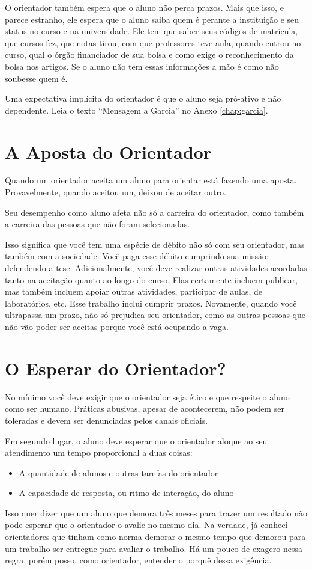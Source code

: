 O orientador também espera que o aluno não perca prazos. Mais que isso, e parece estranho, ele espera que o aluno saiba quem é perante a instituição e seu status no curso e na universidade. Ele tem que saber seus códigos de matrícula, que cursos fez, que notas tirou, com que professores teve aula, quando entrou no curso, qual o órgão financiador de sua bolsa e como exige o reconhecimento da bolsa nos artigos. Se o aluno não tem essas informações a mão é como não soubesse quem é.

Uma expectativa implícita do orientador é que o aluno seja pró-ativo e não dependente. Leia o texto ``Mensagem a Garcia'' no Anexo \ref{chap:garcia}.

\section{A Aposta do Orientador}

Quando um orientador aceita um aluno para orientar está fazendo uma aposta. Provavelmente, quando aceitou um, deixou de aceitar outro.

Seu desempenho como aluno afeta não só a carreira do orientador, como também a carreira das pessoas que não foram selecionadas.

Isso significa que você tem uma espécie de débito não só com seu orientador, mas também com a sociedade. Você paga esse débito cumprindo sua missão: defendendo a tese. Adicionalmente, você deve realizar outras atividades acordadas tanto na aceitação quanto ao longo do curso. Elas certamente incluem publicar, mas também incluem apoiar outras atividades, participar de aulas, de laboratórios, etc. Esse trabalho inclui cumprir prazos. Novamente, quando você ultrapassa um prazo, não só prejudica seu orientador, como as outras pessoas que não vão poder ser aceitas porque você está ocupando a vaga.



\section{O Esperar do Orientador?}

No mínimo você deve exigir que o orientador seja ético e que respeite o aluno como ser humano. Práticas abusivas, apesar de acontecerem, não podem ser toleradas e devem ser denunciadas pelos canais oficiais.

Em segundo lugar, o aluno deve esperar que o orientador aloque ao seu atendimento um tempo proporcional a duas coisas:
\begin{itemize}
    \item A quantidade de alunos e outras tarefas do orientador
    \item A capacidade de resposta, ou ritmo de interação, do aluno
\end{itemize}
Isso quer dizer que um aluno que demora três meses para trazer um resultado não pode esperar que o orientador o avalie no mesmo dia. Na verdade, já conheci orientadores que tinham como norma demorar o mesmo tempo que demorou para um trabalho ser entregue para avaliar o trabalho. Há um pouco de exagero nessa regra, porém posso, como orientador, entender o porquê dessa exigência.

